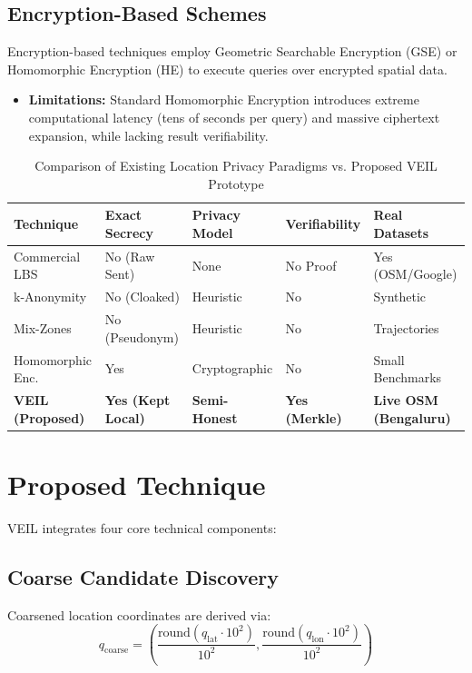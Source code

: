 \documentclass[12pt,a4paper,oneside]{report}
\begin{document}
\subsection{Encryption-Based Schemes}
Encryption-based techniques employ Geometric Searchable Encryption (GSE) or Homomorphic Encryption (HE) to execute queries over encrypted spatial data.
\begin{itemize}
    \item \textbf{Limitations:} Standard Homomorphic Encryption introduces extreme computational latency (tens of seconds per query) and massive ciphertext expansion, while lacking result verifiability.
\end{itemize}

\begin{table}[h!]
\centering
\caption{Comparison of Existing Location Privacy Paradigms vs. Proposed VEIL Prototype}
\label{tab:comparison}
\small
\begin{tabular}{p{3.5cm}p{3cm}p{2.5cm}p{2.5cm}p{2.5cm}}
\toprule
\textbf{Technique} & \textbf{Exact Secrecy} & \textbf{Privacy Model} & \textbf{Verifiability} & \textbf{Real Datasets} \\
\midrule
Commercial LBS & No (Raw Sent) & None & No Proof & Yes (OSM/Google) \\
k-Anonymity & No (Cloaked) & Heuristic & No & Synthetic \\
Mix-Zones & No (Pseudonym) & Heuristic & No & Trajectories \\
Homomorphic Enc. & Yes & Cryptographic & No & Small Benchmarks \\
\textbf{VEIL (Proposed)} & \textbf{Yes (Kept Local)} & \textbf{Semi-Honest} & \textbf{Yes (Merkle)} & \textbf{Live OSM (Bengaluru)} \\
\bottomrule
\end{tabular}
\end{table}

\section{Proposed Technique}
VEIL integrates four core technical components:
\subsection{Coarse Candidate Discovery}
Coarsened location coordinates are derived via:
\begin{equation}
q_{\text{coarse}} = \left( \frac{\text{round}(q_{\text{lat}} \cdot 10^2)}{10^2}, \frac{\text{round}(q_{\text{lon}} \cdot 10^2)}{10^2} \right)
\end{equation}
\end{document}
